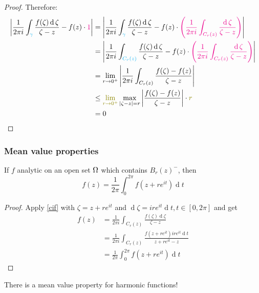 \documentclass[12pt]{article}
\renewcommand{\d}{\ensuremath{\operatorname{d}}}
\begin{document}
\begin{proof}
            Therefore: \begin{align*}
                \left|\frac{1}{2\pi i} \int_{\bt{\gamma}}\frac{f(\zeta)\d \zeta}{\zeta-z}-f(z)\cdot \rt{1}\right| &=  \left|\frac{1}{2\pi i} \int_{\bt{\gamma}}\frac{f(\zeta)\d \zeta}{\zeta-z}-f(z)\cdot \rt{\left(\frac{1}{2\pi i}\int_{C_r(z)}\frac{\d \zeta}{\zeta-z}\right)}\right|\\
                &= \left|\frac{1}{2\pi i} \int_{\bt{C_r(z)}}\frac{f(\zeta)\d \zeta}{\zeta-z}-f(z)\cdot \rt{\left(\frac{1}{2\pi i}\int_{C_r(z)}\frac{\d \zeta}{\zeta-z}\right)}\right|\\
                &= \lim_{r\to 0^+}\left|\frac{1}{2\pi i}\int_{C_r(z)}\frac{f(\zeta)-f(z)}{\zeta-z}\right|\\
                &\leq \gt{\lim_{r\to 0^+}} \max_{|\zeta-z|=r}\left|\frac{f(\zeta)-f(z)}{\zeta-z}\right|\cdot \gt{r}\\
                &= 0
            \end{align*}
\end{proof}

\subsubsection{Mean value properties}
\begin{corollary}
    If $f$ analytic on an open set $\Omega$ which contains $B_r(z)^-$, then \[f(z)=\frac{1}{2\pi}\int_{0}^{2\pi}f(z+re^{it})\d t\]
\end{corollary}
\begin{proof}
    Apply \cref{cif} with $\zeta=z+re^{it}$ and $\d \zeta=ire^{it}\d t, t\in [0,2\pi]$ and get \begin{align*}
        f(z)&= \frac{1}{2\pi i}\int_{C_r(z)}\frac{f(\zeta)\d \zeta}{\zeta-z}\\
        &= \frac{1}{2\pi i}\int_{C_r(z)}\frac{f(z+re^{it})ire^{it}\d t}{z+re^{it}-z}\\
        &= \frac{1}{2\pi}\int_{0}^{2\pi}f(z+re^{it})\d t
    \end{align*}
\end{proof}

\rmk There is a mean value property for harmonic functions!
\end{document}

